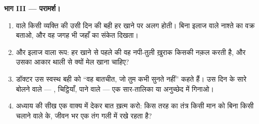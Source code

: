 \begin{problem}
\medskip\noindent\textbf{भाग III --- परामर्श।}
\begin{enumerate}[resume]
  \item {} वाले किसी व्यक्ति की उसी दिन की बही हर खाने पर अलग
        होती। बिना इलाज वाले नाश्ते का वक्र बताओ, और वह जगह भी जहाँ
         का संकेत दिखता।
  \item और इलाज वाला रूप: हर खाने से पहले की वह नपी-तुली ख़ुराक किसकी
        नक़ल करती है, और उसका आकार थाली से क्यों मेल खाना चाहिए?
  \item डॉक्टर उस स्वस्थ बही को ``वह बातचीत, जो तुम कभी सुनते नहीं''
        कहते हैं। उस दिन के सारे बोलने वाले --- , चिट्ठियाँ,
        पाने वाले --- एक सार-तालिका या अनुच्छेद में गिनाओ।
  \item अध्याय की सीख एक वाक्य में देकर बात ख़त्म करो: किस तरह का
        तंत्र किसी मान को बिना किसी चलाने वाले के, जीवन भर एक तंग गली
        में रखे रहता है?
\end{enumerate}
\end{problem}
